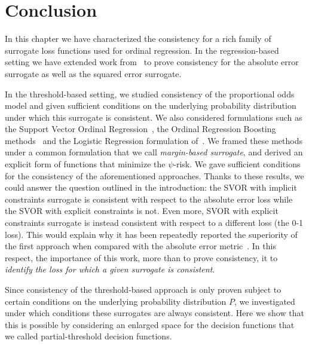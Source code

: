 


\section{Conclusion}


In this chapter we have characterized the consistency for a rich family of surrogate loss functions used for ordinal regression. In the regression-based setting we have extended work from~\citet{Ramaswamy2012} to prove consistency for the absolute error surrogate as well as the squared error surrogate.


In the threshold-based setting, we studied consistency of the proportional odds model and given sufficient conditions on the underlying probability distribution under which this surrogate is consistent. We also considered formulations such as the Support Vector Ordinal Regression~\citep{Keerthi2003}, the Ordinal Regression Boosting methods~\citep{lin2006large} and the Logistic Regression formulation of~\citep{Rennie}. We framed these methods under a common formulation that we call \emph{margin-based surrogate}, and derived an explicit form of functions that minimize the $\psi$-risk. We gave sufficient conditions for the consistency of the aforementioned approaches. Thanks to these results, we could answer the question outlined in the introduction: the SVOR with implicit constraints surrogate is consistent with respect to the absolute error loss while the SVOR with explicit constraints is not. Even more, SVOR with explicit constraints surrogate is instead consistent with respect to a different loss (the 0-1 loss). This would explain why it has been repeatedly reported the superiority of the first approach when compared with the absolute error metric~\citep{Keerthi2003, lin2006large, Rennie}. In this respect, the importance of this work, more than to prove consistency, it to \emph{identify the loss for which a given surrogate is consistent}.


Since consistency of the threshold-based approach is only proven subject to certain conditions on the underlying probability distribution $P$, we  investigated under which conditions these surrogates are always consistent. Here we show that this is possible by considering an enlarged space for the decision functions that we called partial-threshold decision functions.

